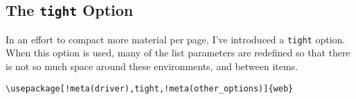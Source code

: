 \documentclass{article}
\let\tops\texorpdfstring
\let\pkg\textsf
\edef\amtIndent{\the\parindent}
\begin{document}
{%
%
%
%
%
%


\subsection{The \texttt{tight} Option}\label{sss:webtight}

In an effort to compact more material per page, I've introduced a
\texttt{tight} option.  When this option is used, many of the list
parameters are redefined so that there is not so much space around these
environments, and between items.
\begin{Verbatim}[xleftmargin=\amtIndent,commandchars=!()]
\usepackage[!meta(driver),tight,!meta(other_options)]{web}
\end{Verbatim}

}
\end{document}
